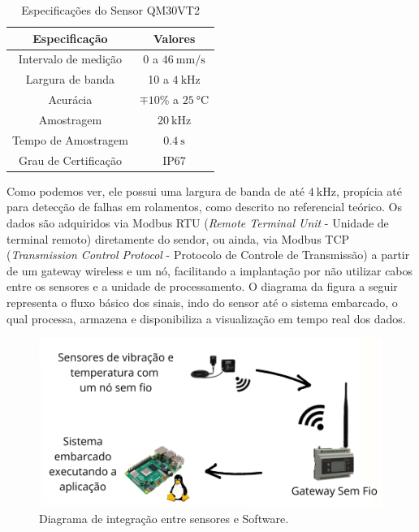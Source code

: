 \begin{table}[H]
    \caption{Especificações do Sensor QM30VT2}
    \label{tab:simulador}
    \centering%
    \begin{minipage}{.45\textwidth}
      \begin{tabular*}{\textwidth}{c|c}
        \hline
        Especificação            & Valores                                     \\ \hline
        \hline
        Intervalo de medição     &  0 a $\SI{46}{\milli\metre\per\second}$     \\
        Largura de banda         &  10 a $\SI{4}{\kilo\hertz}$                 \\ 
        Acurácia                 &  $\mp 10 \%$ a $\SI{25}{\celsius}$          \\
        Amostragem               &  $\SI{20}{\kilo\hertz}$                     \\
        Tempo de Amostragem      &  $\SI{0.4}{\second}$                        \\
        Grau de Certificação     &  IP67                                       \\ \hline
      \end{tabular*}
    \end{minipage}
  \end{table}

Como podemos ver, ele possui uma largura de banda de até $\SI{4}{\kilo\hertz}$, propícia até para detecção de falhas em rolamentos, como 
descrito no referencial teórico. Os dados são adquiridos via Modbus RTU (\textit{Remote Terminal Unit} - Unidade de terminal remoto) diretamente
do sendor, ou ainda, via Modbus TCP (\textit{Transmission Control Protocol} - Protocolo de Controle de Transmissão) a partir de um gateway
wireless e um nó, facilitando a implantação por não utilizar cabos entre os sensores e a unidade de processamento. O diagrama da figura a seguir
representa o fluxo básico dos sinais, indo do sensor até o sistema embarcado, o qual processa, armazena e disponibiliza a visualização em 
tempo real dos dados. 

\begin{figure}[H]
    \caption{Diagrama de integração  entre sensores e Software.}
    \begin{center}
        \includegraphics[scale=0.8, page=1]{metodologia/img/fluxo_layout.pdf}
    \end{center}
    \label{fig:sensor_exaustor}
\end{figure}


